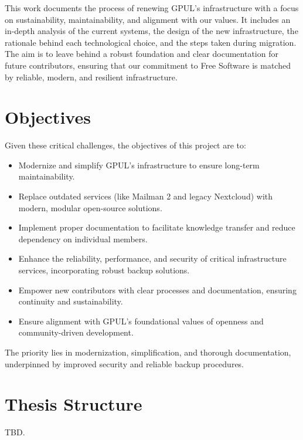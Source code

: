 This work documents the process of renewing GPUL's infrastructure with a focus on sustainability, maintainability, and alignment with our values. It includes an in-depth analysis of the current systems, the design of the new infrastructure, the rationale behind each technological choice, and the steps taken during migration. The aim is to leave behind a robust foundation and clear documentation for future contributors, ensuring that our commitment to Free Software is matched by reliable, modern, and resilient infrastructure.

\section{Objectives}

Given these critical challenges, the objectives of this project are to:

\begin{itemize}
    \item Modernize and simplify GPUL's infrastructure to ensure long-term maintainability.
    \item Replace outdated services (like Mailman 2 and legacy Nextcloud) with modern, modular open-source solutions.
    \item Implement proper documentation to facilitate knowledge transfer and reduce dependency on individual members.
    \item Enhance the reliability, performance, and security of critical infrastructure services, incorporating robust backup solutions.
    \item Empower new contributors with clear processes and documentation, ensuring continuity and sustainability.
    \item Ensure alignment with GPUL's foundational values of openness and community-driven development.
\end{itemize}

The priority lies in modernization, simplification, and thorough documentation, underpinned by improved security and reliable backup procedures.

\section{Thesis Structure}

TBD.
